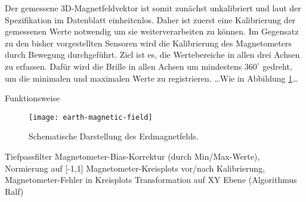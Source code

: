 Der gemessene 3D-Magnetfeldvektor ist somit zunächst unkalibriert und laut der Spezifikation im Datenblatt  einheitenlos.
Daher ist zuerst eine Kalibrierung der gemessenen Werte notwendig um sie weiterverarbeiten zu können.
Im Gegensatz zu den bisher vorgestellten Sensoren wird die Kalibrierung des Magnetometers durch Bewegung durchgeführt.
Ziel ist es, die Wertebereiche in allen drei Achsen zu erfassen.
Dafür wird die Brille in allen Achsen um mindestens $360^\circ$ gedreht, um die minimalen und maximalen Werte zu registrieren. \ldots Wie in Abbildung \ref{fig:mag_world}\ldots



Funktionsweise

\begin{figure}
   \centering
   \texttt{[image: earth-magnetic-field]}
   \caption[mag_world]{Schematische Darstellung des Erdmagnetfelds.}
   \label{fig:mag_world}
\end{figure}

Tiefpassfilter
Magnetometer-Bias-Korrektur (durch Min/Max-Werte), Normierung auf [-1,1]
Magnetometer-Kreisplots vor/nach Kalibrierung, Magnetometer-Fehler in Kreisplots
Transformation auf XY Ebene (Algorithmus Ralf)



